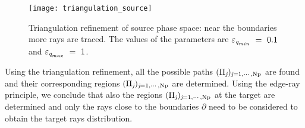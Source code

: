 \begin{figure}[h]
  \begin{center}
  \texttt{[image: triangulation\_source]}
  \end{center}
  \caption{Triangulation refinement of source phase space:
  near the boundaries more rays are traced.
    The values of the parameters are $\varepsilon_{\textit{q}_{min}}~=~ 0.1$ and $\varepsilon_{\textit{q}_{max}}~=~1$.}
   \label{fig:triangulation_refinement}
  \end{figure}
Using the triangulation refinement, all the possible paths $(\Pi_{\textit{j}})_{\textit{j} = 1, \cdots, \textrm{Np}}$ are found and their corresponding regions $(\Pi_{\textit{j}})_{\textit{j} = 1, \cdots, \textrm{Np}}$ are determined. Using the edge-ray principle, we conclude that also the regions $(\Pi_{\textit{j}})_{\textit{j} = 1, \cdots, \textrm{Np}}$ at the target are determined and only the rays close to the boundaries
$\partial$ need to be considered to obtain the target rays distribution.
